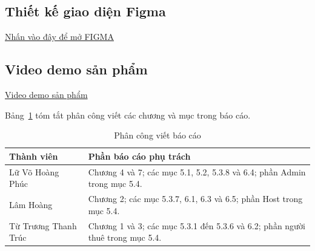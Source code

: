 \subsection*{Thiết kế giao diện Figma}
\begin{center}
\href{https://www.figma.com/design/OAJ9pPqR3CWAcIfSuo5s3r/Untitled?node-id=0-1\&t=u8GIv9DUp24mnwg1-1}{\textcolor{uehblue}{\faFigma\hspace{0.25cm}Nhấn vào đây để mở FIGMA}}
\end{center}

\subsection*{Video demo sản phẩm}
\begin{center}
\href{https://youtube.com/playlist?list=PLa4LDgd4xXAo\&si=vXRBWmxMzxkjoVV5}{\textcolor{uehblue}{\faYoutube\hspace{0.25cm}Video demo sản phẩm}}
\end{center}

\noindent Bảng~\ref{tab:team-responsibilities} tóm tắt phân công viết các chương và mục trong báo cáo.

\begin{table}[H]\centering\small
\caption{Phân công viết báo cáo}\label{tab:team-responsibilities}
\begin{tabularx}{\linewidth}{@{}p{4.5cm}X@{}}\toprule
Thành viên & Phần báo cáo phụ trách\\\midrule
Lữ Võ Hoàng Phúc & Chương 4 và 7; các mục 5.1, 5.2, 5.3.8 và 6.4; phần Admin trong mục 5.4.\\
Lâm Hoàng & Chương 2; các mục 5.3.7, 6.1, 6.3 và 6.5; phần Host trong mục 5.4.\\
Từ Trương Thanh Trúc & Chương 1 và 3; các mục 5.3.1 đến 5.3.6 và 6.2; phần người thuê trong mục 5.4.\\
\bottomrule\end{tabularx}
\end{table}
